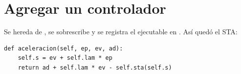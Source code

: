 \section{Agregar un controlador}

Se hereda de , se sobrescribe  y se registra el
ejecutable en . Así quedó el STA:
\begin{lstlisting}[style=py]
def aceleracion(self, ep, ev, ad):
    self.s = ev + self.lam * ep
    return ad + self.lam * ev - self.sta(self.s)
\end{lstlisting}
